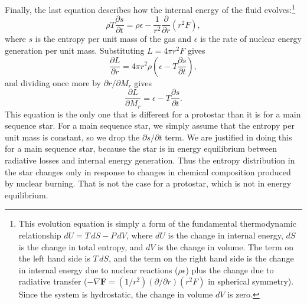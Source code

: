 Finally, the last equation describes how the internal energy of the fluid evolves:\footnote{This evolution equation is simply a form of the fundamental thermodynamic relationship $dU = T\, dS - P\, dV$, where $dU$ is the change in internal energy, $dS$ is the change in total entropy, and $dV$ is the change in volume. The term on the left hand side is $T \, dS$, and the term on the right hand side is the change in internal energy due to nuclear reactions ($\rho \epsilon$) plus the change due to radiative transfer ($-\nabla \mathbf{F} = (1/r^2) (\partial/\partial r)(r^2 F)$ in spherical symmetry). Since the system is hydrostatic, the change in volume $dV$ is zero.}
\begin{equation}
\rho T\frac{\partial s}{\partial t} = \rho \epsilon - \frac{1}{r^2}\frac{\partial}{\partial r}(r^2 F),
\end{equation}
where $s$ is the entropy per unit mass of the gas and $\epsilon$ is the rate of nuclear energy generation per unit mass. Substituting $L = 4 \pi r^2 F$ gives
\begin{equation}
\frac{\partial L}{\partial r} = 4\pi r^2 \rho \left(\epsilon - T\frac{\partial s}{\partial t}\right),
\end{equation}
and dividing once more by $\partial r/\partial M_r$ gives
\begin{equation}
\label{heat}
\frac{\partial L}{\partial M_r} = \epsilon - T\frac{\partial s}{\partial t}.
\end{equation}
This equation is the only one that is different for a protostar than it is for a main sequence star. For a main sequence star, we simply assume that the entropy per unit mass is constant, so we drop the $\partial s/\partial t$ term. We are justified in doing this for a main sequence star, because the star is in energy equilibrium between radiative losses and internal energy generation. Thus the entropy distribution in the star changes only in response to changes in chemical composition produced by nuclear burning. That is not the case for a protostar, which is not in energy equilibrium.

